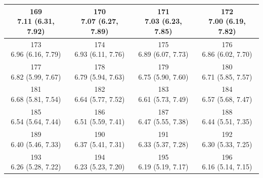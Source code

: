 \begin{table}[htbp]
\begin{tabular}{cccc}
\hline
\shortstack[c]{169\\7.11 (6.31, 7.92)} & \shortstack[c]{170\\7.07 (6.27, 7.89)} & \shortstack[c]{171\\7.03 (6.23, 7.85)} & \shortstack[c]{172\\7.00 (6.19, 7.82)} \\
\hline
\shortstack[c]{173\\6.96 (6.16, 7.79)} & \shortstack[c]{174\\6.93 (6.11, 7.76)} & \shortstack[c]{175\\6.89 (6.07, 7.73)} & \shortstack[c]{176\\6.86 (6.02, 7.70)} \\
\hline
\shortstack[c]{177\\6.82 (5.99, 7.67)} & \shortstack[c]{178\\6.79 (5.94, 7.63)} & \shortstack[c]{179\\6.75 (5.90, 7.60)} & \shortstack[c]{180\\6.71 (5.85, 7.57)} \\
\hline
\shortstack[c]{181\\6.68 (5.81, 7.54)} & \shortstack[c]{182\\6.64 (5.77, 7.52)} & \shortstack[c]{183\\6.61 (5.73, 7.49)} & \shortstack[c]{184\\6.57 (5.68, 7.47)} \\
\hline
\shortstack[c]{185\\6.54 (5.64, 7.44)} & \shortstack[c]{186\\6.51 (5.59, 7.41)} & \shortstack[c]{187\\6.47 (5.55, 7.38)} & \shortstack[c]{188\\6.44 (5.51, 7.35)} \\
\hline
\shortstack[c]{189\\6.40 (5.46, 7.33)} & \shortstack[c]{190\\6.37 (5.41, 7.31)} & \shortstack[c]{191\\6.33 (5.37, 7.28)} & \shortstack[c]{192\\6.30 (5.33, 7.25)} \\
\hline
\shortstack[c]{193\\6.26 (5.28, 7.22)} & \shortstack[c]{194\\6.23 (5.23, 7.20)} & \shortstack[c]{195\\6.19 (5.19, 7.17)} & \shortstack[c]{196\\6.16 (5.14, 7.15)} \\

\end{tabular}
\end{table}
